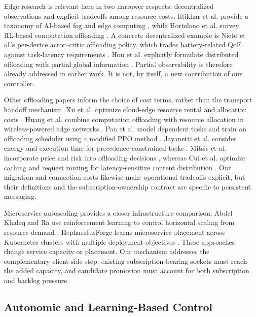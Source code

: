 \documentclass[manuscript]{acmart}
\begin{document}
Edge research is relevant here in two narrower respects: decentralized
observations and explicit tradeoffs among resource costs. Iftikhar et al.
provide a taxonomy of AI-based fog and edge computing \cite{Iftikhar2023EdgeAI},
while Hortelano et al. survey RL-based computation offloading
\cite{Hortelano2023RLOffloading}. A concrete decentralized example is Nieto
et al.'s per-device actor--critic offloading policy, which trades battery-related
QoE against task-latency requirements \cite{Nieto2024DRLOffloading}. Hou et al.
explicitly formulate distributed offloading with partial global information
\cite{Hou2023PODRL}. Partial observability is therefore already addressed in
earlier work. It is not, by itself, a new contribution of our controller.

Other offloading papers inform the choice of cost terms, rather than the
transport handoff mechanism. Xu et al. optimize cloud-edge resource rental and
allocation costs \cite{Xu2022CloudEdgeResource}. Huang et al. combine
computation offloading with resource allocation in wireless-powered edge
networks \cite{Huang2020Offloading}. Pan et al. model dependent tasks and train
an offloading scheduler using a modified PPO method \cite{Pan2023ICNOffloading}.
Jayanetti et al. consider energy and execution time for precedence-constrained
tasks \cite{Jayanetti2022EdgeCloudScheduling}. Mitsis et al. incorporate price
and risk into offloading decisions \cite{Mitsis2022RiskOffloading}, whereas Cui
et al. optimize caching and request routing for latency-sensitive content
distribution \cite{Cui2023IoTEdgeCloud}. Our migration and connection costs
likewise make operational tradeoffs explicit, but their definitions and the
subscription-ownership contract are specific to persistent messaging.

Microservice autoscaling provides a closer infrastructure comparison.
Abdel Khaleq and Ra use reinforcement learning to control horizontal scaling
from resource demand \cite{AbdelKhaleq2021Autoscaling}. HephaestusForge learns
microservice placement across Kubernetes clusters with multiple deployment
objectives \cite{Santos2025HephaestusForge}. These approaches change service
capacity or placement. Our mechanism addresses the complementary client-side
step: existing subscription-bearing sockets must reach the added capacity,
and candidate promotion must account for both subscription and backlog pressure.

\subsection{Autonomic and Learning-Based Control}
\end{document}
